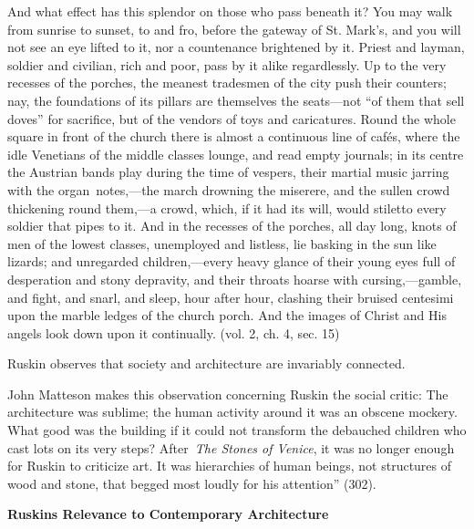 {\color{black}
And what effect has this splendor on those who pass beneath it?  You may
walk from sunrise to sunset, to and fro, before the gateway of St.
Mark’s, and you will not see an eye lifted to it, nor a countenance
brightened by it.  Priest and layman, soldier and civilian, rich and
poor, pass by it alike regardlessly.  Up to the very recesses of the
porches, the meanest tradesmen of the city push their counters; nay,
the foundations of its pillars are themselves the seats—not “of them
that sell doves” for sacrifice, but of the vendors of toys and
caricatures.  Round the whole square in front of the church there is
almost a continuous line of cafés, where the idle Venetians of the
middle classes lounge, and read empty journals; in its centre the
Austrian bands play during the time of vespers, their martial music
jarring with the organ~notes,—the march drowning the miserere, and the
sullen crowd thickening round them,—a crowd, which, if it had its will,
would stiletto every soldier that pipes to it.  And in the recesses of
the porches, all day long, knots of men of the lowest classes,
unemployed and listless, lie basking in the sun like lizards; and
unregarded children,—every heavy glance of their young eyes full of
desperation and stony depravity, and their throats hoarse with
cursing,—gamble, and fight, and snarl, and sleep, hour after hour,
clashing their bruised centesimi upon the marble ledges of the church
porch.  And the images of Christ and His angels look down upon it
continually.  (vol. 2, ch. 4, sec. 15)}

{\color{black}
Ruskin observes that society and architecture are invariably connected.}

{\color{black}
John Matteson makes this observation concerning Ruskin the social
critic: {\textquotedbl}The architecture was sublime; the human activity
around it was an obscene mockery.  What good was the building if it
could not transform the debauched children who cast lots on its very
steps?  After~\textit{The Stones of Venice}, it was no longer enough
for Ruskin to criticize art.  It was hierarchies of human beings, not
structures of wood and stone, that begged most loudly for his
attention”  (302).}


\bigskip


\bigskip


\bigskip

{\centering\color{black}
\textbf{Ruskin{\textquotesingle}s Relevance to Contemporary
Architecture}
\par}

